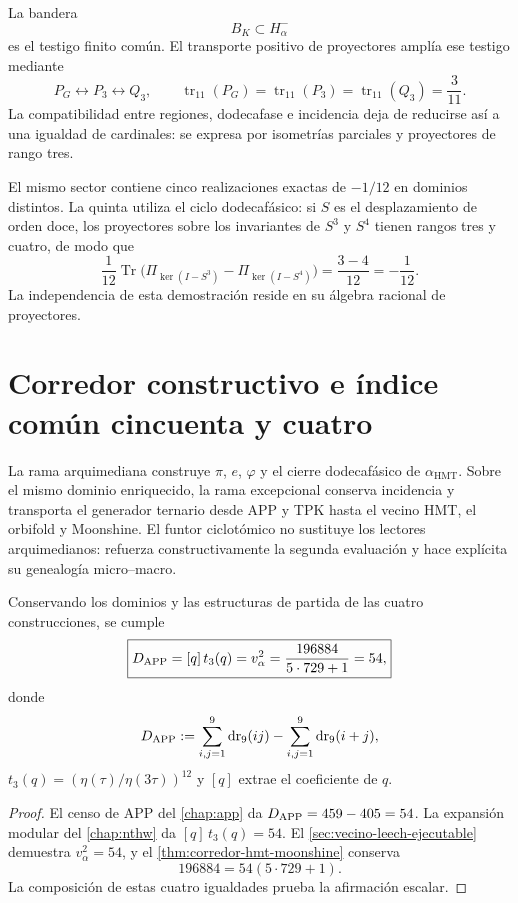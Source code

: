 La bandera
\[
B_K\subset H_\alpha^-
\]
es el testigo finito común. El transporte positivo de proyectores amplía ese
testigo mediante
\[
P_G\longleftrightarrow P_3\longleftrightarrow Q_3,
\qquad
\operatorname{tr}_{11}(P_G)
=\operatorname{tr}_{11}(P_3)
=\operatorname{tr}_{11}(Q_3)
=\frac3{11}.
\]
La compatibilidad entre regiones, dodecafase e incidencia deja de reducirse
así a una igualdad de cardinales: se expresa por isometrías parciales y
proyectores de rango tres.

El mismo sector contiene cinco realizaciones exactas de \(-1/12\) en
dominios distintos. La quinta utiliza el ciclo dodecafásico: si \(S\) es el
desplazamiento de orden doce, los proyectores sobre los invariantes de
\(S^3\) y \(S^4\) tienen rangos tres y cuatro, de modo que
\[
\frac1{12}\operatorname{Tr}
\bigl(\Pi_{\ker(I-S^3)}-\Pi_{\ker(I-S^4)}\bigr)
=\frac{3-4}{12}=-\frac1{12}.
\]
La independencia de esta demostración reside en su álgebra racional de
proyectores.

\section{Corredor constructivo e índice común cincuenta y cuatro}
\label{sec:coherencia-tipada-defecto-54}

La rama arquimediana construye \(\pi\), \(e\), \(\varphi\) y el cierre
dodecafásico de \(\alpha_{\mathrm{HMT}}\). Sobre el mismo dominio
enriquecido, la rama excepcional conserva incidencia y transporta el
generador ternario desde APP y TPK hasta el vecino HMT, el orbifold y
Moonshine. El funtor ciclotómico no sustituye los lectores arquimedianos:
refuerza constructivamente la segunda evaluación y hace explícita su
genealogía micro--macro.

\begin{corollary}
\label{prop:coincidencia-escalar-tipada-54}
Conservando los dominios y las estructuras de partida de las cuatro
construcciones, se cumple
\[
\boxed{
 D_{\rm APP}
 =[q]\,t_3(q)
 =v_\alpha^2
 =\frac{196884}{5\cdot729+1}
 =54,}
\]
donde
\[
 D_{\rm APP}
 :=\sum_{i,j=1}^{9}\operatorname{dr}_9(ij)
   -\sum_{i,j=1}^{9}\operatorname{dr}_9(i+j),
\]
\(t_3(q)=(\eta(\tau)/\eta(3\tau))^{12}\) y \([q]\) extrae el
coeficiente de \(q\).
\end{corollary}

\begin{proof}
El censo de APP del \cref{chap:app} da
\(D_{\rm APP}=459-405=54\). La expansión modular del
\cref{chap:nthw} da \([q]\,t_3(q)=54\). El
\cref{sec:vecino-leech-ejecutable} demuestra
\(v_\alpha^2=54\), y el \cref{thm:corredor-hmt-moonshine} conserva
\[
 196884=54(5\cdot729+1).
\]
La composición de estas cuatro igualdades prueba la afirmación escalar.
\end{proof}

